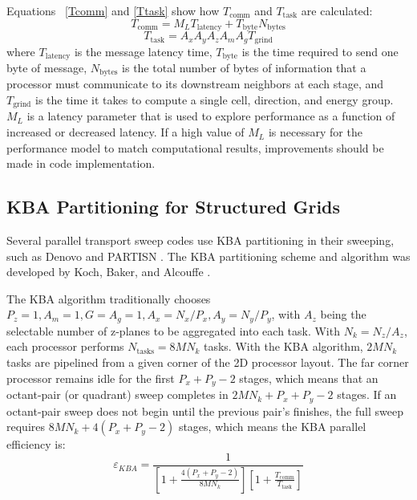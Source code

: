 \documentclass{anstrans}
\begin{document}
Equations ~\eqref{Tcomm} and \ref{Ttask} show how $T_{\text{comm}}$ and $T_{\text{task}}$ are calculated:
\begin{equation}
T_{\text{comm}} = M_L T_{\text{latency}} + T_{\text{byte}} N_{\text{bytes}}
\label{Tcomm}
\end{equation}
\begin{equation}
T_{\text{task}} = A_x A_y A_z A_m A_g T_{\text{grind}}
\label{Ttask}
\end{equation}
where $T_{\text{latency}}$ is the message latency time, $T_{\text{byte}}$ is the time required to send one byte of message, $N_{\text{bytes}}$ is the total number of bytes of information that a processor must communicate to its downstream neighbors at each stage, and $T_{\text{grind}}$ is the time it takes to compute a single cell, direction, and energy group. $M_L$ is a latency parameter that is used to explore performance as a function of increased or decreased latency. If a high value of $M_L$ is necessary for the performance model to match computational results, improvements should be made in code implementation.

\subsection{KBA Partitioning for Structured Grids}

Several parallel transport sweep codes use KBA partitioning in their sweeping, such as Denovo \cite{denovo} and PARTISN \cite{partisn}. The KBA partitioning scheme and algorithm was developed by Koch, Baker, and Alcouffe \cite{partisn}.

The KBA algorithm traditionally chooses $P_z = 1, A_m = 1, G = A_g = 1, A_x = N_x/P_x, A_y = N_y/P_y$, with $A_z$ being the selectable number of z-planes to be aggregated into each task. With $N_k = N_z/A_z$, each processor performs $N_{\text{tasks}} = 8MN_k$ tasks. With the KBA algorithm, $2MN_k$ tasks are pipelined from a given corner of the 2D processor layout. The far corner processor remains idle for the first $P_x + P_y - 2 $ stages, which means that an octant-pair (or quadrant) sweep completes in $2MN_k + P_x + P_y - 2$ stages. If an octant-pair sweep does not begin until the previous pair's finishes, the full sweep requires $8MN_k + 4(P_x+P_y-2)$ stages, which means the KBA parallel efficiency is:
\begin{equation}
\varepsilon_{KBA} = \frac{1}{[1+\frac{4(P_x+P_y-2)}{8MN_k}][1+\frac{T_{\text{comm}}}{T_{\text{task}}}]}
\label{eKBA}
\end{equation}
\end{document}
